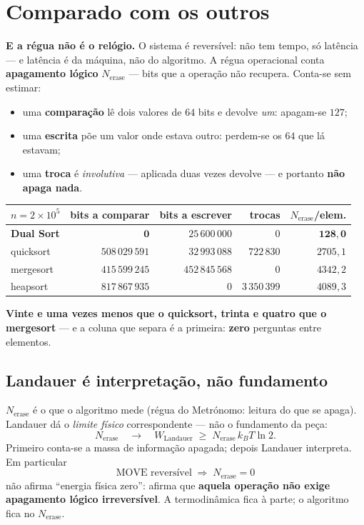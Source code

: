 \documentclass[11pt,a4paper]{article}
\begin{document}
\section{Comparado com os outros}

\textbf{E a régua não é o relógio.} O sistema é reversível: não tem tempo, só latência --- e
latência é da máquina, não do algoritmo. A régua operacional conta \textbf{apagamento lógico}
$N_{\mathrm{erase}}$ --- bits que a operação não recupera. Conta-se sem estimar:

\begin{itemize}\itemsep2pt
\item uma \textbf{comparação} lê dois valores de $64$ bits e devolve \emph{um}: apagam-se $127$;
\item uma \textbf{escrita} põe um valor onde estava outro: perdem-se os $64$ que lá estavam;
\item uma \textbf{troca} é \emph{involutiva} --- aplicada duas vezes devolve --- e portanto
\textbf{não apaga nada}.
\end{itemize}

\begin{center}\small
\begin{tabular}{@{}lrrrr@{}}
\toprule
$n=2\times10^{5}$ & bits a comparar & bits a escrever & trocas & \textbf{$N_{\mathrm{erase}}$/elem.} \\
\midrule
\textbf{Dual Sort} & $\mathbf{0}$ & $25\,600\,000$ & $0$ & $\mathbf{128{,}0}$ \\
quicksort & $508\,029\,591$ & $32\,993\,088$ & $722\,830$ & $2705{,}1$ \\
mergesort & $415\,599\,245$ & $452\,845\,568$ & $0$ & $4342{,}2$ \\
heapsort  & $817\,867\,935$ & $0$ & $3\,350\,399$ & $4089{,}3$ \\
\bottomrule
\end{tabular}
\end{center}

\noindent \textbf{Vinte e uma vezes menos que o quicksort, trinta e quatro que o mergesort} --- e a coluna que
separa é a primeira: \textbf{zero} perguntas entre elementos.

\subsection*{Landauer é interpretação, não fundamento}

$N_{\mathrm{erase}}$ é o que o algoritmo mede (régua do Metrónomo: leitura do que se apaga).
Landauer dá o \emph{limite físico} correspondente --- não o fundamento da peça:
\[
  N_{\mathrm{erase}}
  \quad\longrightarrow\quad
  W_{\mathrm{Landauer}}
  \;\ge\;
  N_{\mathrm{erase}}\,k_{B}T\ln 2 .
\]
Primeiro conta-se a massa de informação apagada; depois Landauer interpreta. Em particular
\[
  \boxed{\;\mathrm{MOVE}\text{ reversível}\;\Longrightarrow\;N_{\mathrm{erase}}=0\;}
\]
não afirma ``energia física zero'': afirma que \textbf{aquela operação não exige apagamento
lógico irreversível}. A termodinâmica fica à parte; o algoritmo fica no $N_{\mathrm{erase}}$.
\end{document}
